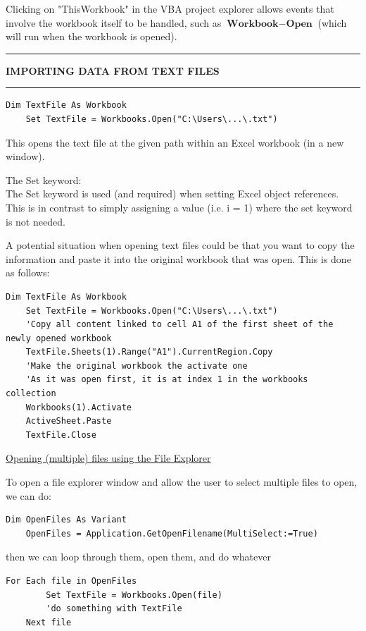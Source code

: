 \documentclass[8pt]{extarticle}
\newcommand{\heading}[1]{%
    \noindent
    \rule{\linewidth}{0.4pt}
    \begin{center}
        \vspace{-1ex}
        \textbf{#1}        
        \vspace{-2.5ex}
    \end{center}
    \rule{\linewidth}{0.4pt}
}
\begin{document}
\begin{multicols}{3}
\begin{tcolorbox}[colback=gray!10, colframe=gray!50]
Clicking on "ThisWorkbook" in the VBA project explorer allows events that involve the workbook itself to be handled, such as $\textbf{Workbook} - \textbf{Open}$ (which will run when the workbook is opened).
\end{tcolorbox}

\columnbreak
\heading{IMPORTING DATA FROM TEXT FILES}

\begin{lstlisting}[style=vba]
    Dim TextFile As Workbook
    Set TextFile = Workbooks.Open("C:\Users\...\.txt")
\end{lstlisting}
This opens the text file at the given path within an Excel workbook (in a new window).

\begin{tcolorbox}[colback=gray!10, colframe=gray!50]
The Set keyword:\\

The Set keyword is used (and required) when setting Excel object references. This is in contrast to simply assigning a value (i.e. i = 1) where the set keyword is not needed.
\end{tcolorbox}

A potential situation when opening text files could be that you want to copy the information and paste it into the original workbook that was open. This is done as follows:
\begin{lstlisting}[style=vba]
    Dim TextFile As Workbook
    Set TextFile = Workbooks.Open("C:\Users\...\.txt")
    'Copy all content linked to cell A1 of the first sheet of the newly opened workbook
    TextFile.Sheets(1).Range("A1").CurrentRegion.Copy
    'Make the original workbook the activate one
    'As it was open first, it is at index 1 in the workbooks collection
    Workbooks(1).Activate
    ActiveSheet.Paste
    TextFile.Close
\end{lstlisting}

\begin{center}
    \underline{Opening (multiple) files using the File Explorer}
\end{center}

To open a file explorer window and allow the user to select multiple files to open, we can do:

\begin{lstlisting}[style=vba]
    Dim OpenFiles As Variant
    OpenFiles = Application.GetOpenFilename(MultiSelect:=True)
\end{lstlisting}

then we can loop through them, open them, and do whatever

\begin{lstlisting}[style=vba]
    For Each file in OpenFiles   
        Set TextFile = Workbooks.Open(file)
        'do something with TextFile
    Next file
\end{lstlisting}

\end{multicols}
\end{document}
